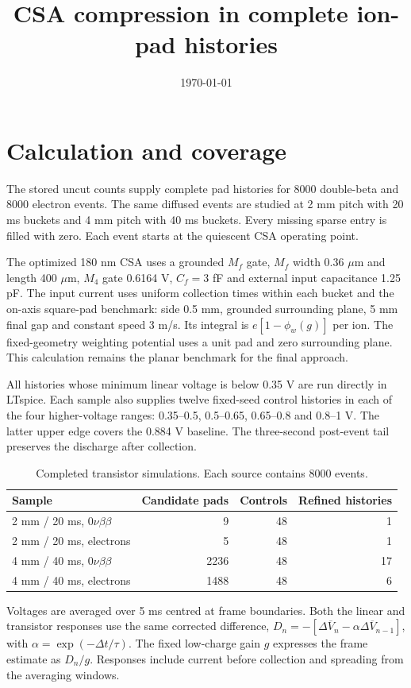 \documentclass[11pt,a4paper]{article}
\title{CSA compression in complete ion-pad histories}
\date{\today}
\begin{document}
\maketitle
\section{Calculation and coverage}
The stored uncut counts supply complete pad histories for 8000 double-beta and
8000 electron events. The same diffused events are studied at 2 mm pitch with
20 ms buckets and 4 mm pitch with 40 ms buckets. Every missing sparse entry is
filled with zero. Each event starts at the quiescent CSA operating point.

The optimized 180 nm CSA uses a grounded $M_f$ gate, $M_f$ width 0.36 $\mu$m and
length 400 $\mu$m, $M_4$ gate 0.6164 V, $C_f=3$ fF and external input
capacitance 1.25 pF. The input current uses uniform collection times within each
bucket and the on-axis square-pad benchmark: side 0.5 mm, grounded surrounding
plane, 5 mm final gap and constant speed 3 m/s. Its integral is
$e[1-\phi_w(g)]$ per ion. The fixed-geometry weighting potential uses a unit pad
and zero surrounding plane. This calculation remains the planar benchmark for
the final approach.

All histories whose minimum linear voltage is below 0.35 V are run directly
in LTspice. Each sample also supplies twelve fixed-seed control histories in
each of the four higher-voltage ranges: 0.35--0.5, 0.5--0.65, 0.65--0.8 and
0.8--1 V. The latter upper edge covers the 0.884 V baseline. The three-second
post-event tail preserves the discharge after collection.

\begin{table}[ht]\centering
\begin{tabular}{lrrr}\toprule
Sample & Candidate pads & Controls & Refined histories\\\midrule
2 mm / 20 ms, $0\nu\beta\beta$ & 9 & 48 & 1 \\
2 mm / 20 ms, electrons & 5 & 48 & 1 \\
4 mm / 40 ms, $0\nu\beta\beta$ & 2236 & 48 & 17 \\
4 mm / 40 ms, electrons & 1488 & 48 & 6 \\
\bottomrule\end{tabular}
\caption{Completed transistor simulations. Each source contains 8000 events.}
\end{table}

Voltages are averaged over 5 ms centred at frame boundaries. Both the linear
and transistor responses use the same corrected difference,
$D_n=-[\Delta\overline V_n-\alpha\Delta\overline V_{n-1}]$, with
$\alpha=\exp(-\Delta t/\tau)$. The fixed low-charge gain $g$ expresses the
frame estimate as $D_n/g$. Responses include current before collection and
spreading from the averaging windows.
\end{document}
